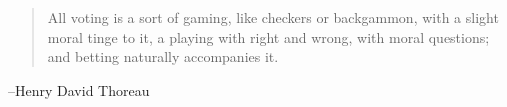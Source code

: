 \documentclass{exam}
\begin{document}
  \else
    \vspace{11 cm}
    \begin{quote}
      \begin{em}
        All voting is a sort of gaming, like checkers or backgammon, with a
        slight moral tinge to it, a playing with right and wrong, with moral
        questions; and betting naturally accompanies it. 

      \end{em}
    \end{quote}
    \hspace{1 cm} --Henry David Thoreau
  \fi
\end{document}
